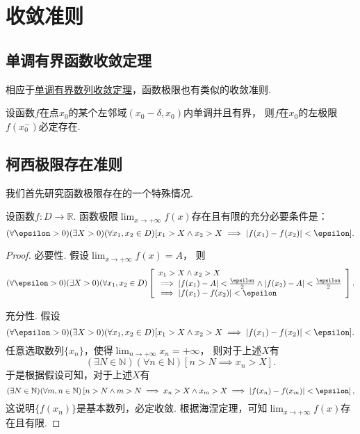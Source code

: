 \section{收敛准则}
\subsection{单调有界函数收敛定理}
相应于\hyperref[theorem:极限.数列的单调有界定理]{单调有界数列收敛定理}，函数极限也有类似的收敛准则.
\begin{theorem}\label{theorem:极限.函数的单调有界定理}
设函数\(f\)在点\(x_0\)的某个左邻域\((x_0-\delta,x_0)\)内单调并且有界，
则\(f\)在\(x_0\)的左极限\(f(x_0^-)\)必定存在.
\end{theorem}

\subsection{柯西极限存在准则}
我们首先研究函数极限存在的一个特殊情况.

\begin{theorem}\label{theorem:极限.函数的柯西极限存在准则}
设函数\(f\colon D\to\mathbb{R}\).
函数极限\(\lim_{x\to+\infty} f(x)\)存在且有限的充分必要条件是：\[
	(\forall\epsilon>0)
	(\exists X>0)
	(\forall x_1,x_2\in D)\\ \relax
	[
		x_1 > X \land x_2 > X
		\implies
		\abs{f(x_1) - f(x_2)} < \epsilon
	].
\]
\begin{proof}
必要性.
假设\(\lim_{x\to+\infty} f(x) = A\)，
则\[
	(\forall\epsilon>0)
	(\exists X>0)
	(\forall x_1,x_2\in D)
	\left[
		\begin{array}{l}
			x_1 > X \land x_2 > X \\
			\implies
			\abs{f(x_1) - A} < \frac\epsilon2
			\land
			\abs{f(x_2) - A} < \frac\epsilon2 \\
			\implies
			\abs{f(x_1) - f(x_2)} < \epsilon
		\end{array}
	\right].
\]

充分性.
假设\[
	(\forall\epsilon>0)
	(\exists X>0)
	(\forall x_1,x_2\in D)
	[
		x_1 > X \land x_2 > X
		\implies
		\abs{f(x_1) - f(x_2)} < \epsilon
	].
\]
任意选取数列\(\{x_n\}\)，使得\(\lim_{n\to+\infty} x_n = +\infty\)，
则对于上述\(X\)有\[
	(\exists N\in\mathbb{N})
	(\forall n\in\mathbb{N})
	[
		n > N
		\implies
		x_n > X
	].
\]
于是根据假设可知，对于上述\(X\)有\[
	(\exists N\in\mathbb{N})
	(\forall m,n\in\mathbb{N})
	\left[
		n > N \land m > N
		\implies
		x_n > X \land x_m > X
		\implies
		\abs{f(x_n) - f(x_m)} < \epsilon
	\right],
\]
这说明\(\{f(x_n)\}\)是基本数列，必定收敛.
根据海涅定理，可知\(\lim_{x\to+\infty} f(x)\)存在且有限.
\end{proof}
\end{theorem}

